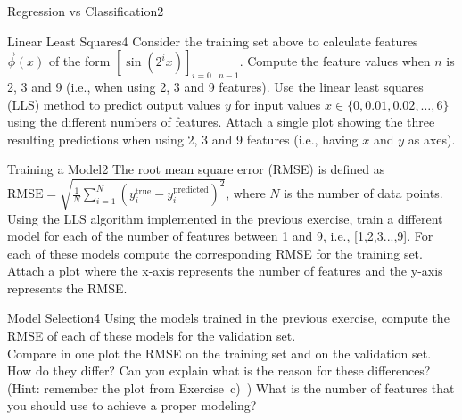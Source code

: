 \begin{questions}
\begin{question}{Regression vs Classification}{2}
\begin{answer}
\end{answer}
\end{question}
	
	
	
	\begin{question}{Linear Least Squares}{4}
		Consider the training set above to calculate features $\vec{\phi}(x)$ of the form $[\sin(2^{i}x)]_{i = 0 \ldots n-1}$. 
		Compute the feature values when $n$ is 2, 3 and 9 (i.e., when using 2, 3 and 9 features). 
		Use the linear least squares (LLS) method to predict output values $y$ for input values $x\in\{0, 0.01, 0.02, \ldots, 6\}$ using the different numbers of features. 
		Attach a single plot showing the three resulting predictions when using 2, 3 and 9 features (i.e., having $x$ and $y$ as axes).
		
\begin{answer}
\end{answer}
		
	\end{question}
	
	
	
	\begin{question}{Training a Model}{2}
		The root mean square error (RMSE) is defined as $\text{RMSE} = \sqrt{\frac{1}{N}\sum_{i=1}^{N}(y^{\text{true}}_i-y^{\text{predicted}}_i)^{2}}$, where $N$ is the number of data points. 
		Using the LLS algorithm implemented in the previous exercise, train a different model for each of the number of features between 1 and 9, i.e.,  [1,2,3...,9].
		For each of these models compute the corresponding RMSE for the training set. 
		Attach a plot where the x-axis represents the number of features and the y-axis represents the RMSE.
		
\begin{answer}
\end{answer}
		
	\end{question}
	
	
	
	\begin{question}{Model Selection}{4}
		Using the models trained in the previous exercise, compute the RMSE of each of these models for the validation set.\\
		Compare in one plot the RMSE on the training set and on the validation set. 
		How do they differ? 
		Can you explain what is the reason for these differences? (Hint: remember the plot from Exercise~c)~) 
		What is the number of features that you should use to achieve a proper modeling?
		

\end{question}
\end{questions}
